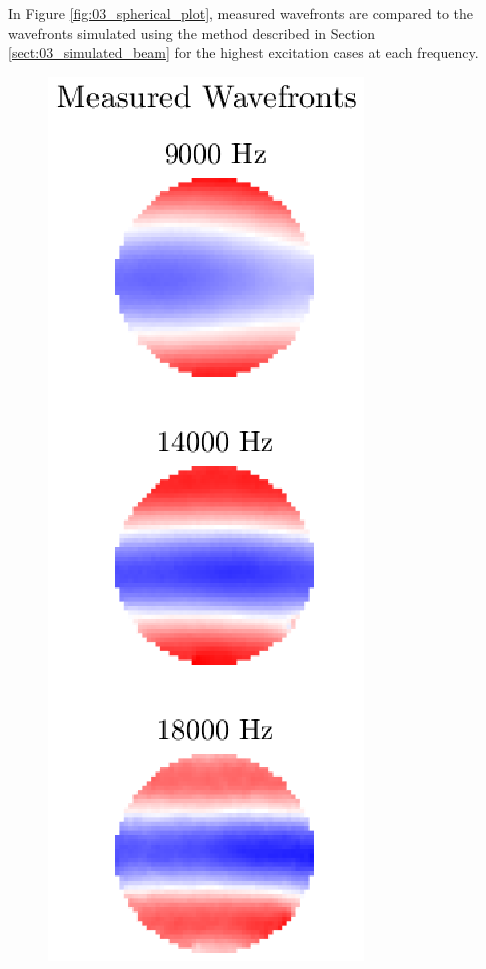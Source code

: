 In Figure \ref{fig:03_spherical_plot}, measured wavefronts are compared to the wavefronts simulated using the method described in Section \ref{sect:03_simulated_beam} for the highest excitation cases at each frequency.
\begin{figure}
  \centering
  \includegraphics{../matlab/03_aero_optics_acoustics/spherical_plot_measured.eps}

\end{figure}
